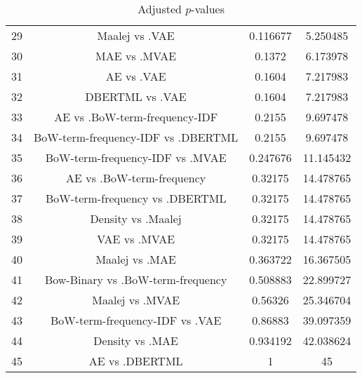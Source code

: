 \documentclass[a4paper,10pt]{article}
\begin{document}
\begin{landscape}
\begin{table}[!htp]
\begin{tabular}{cccc}
29&Maalej vs .VAE&0.116677&5.250485\\
30&MAE vs .MVAE&0.1372&6.173978\\
31&AE vs .VAE&0.1604&7.217983\\
32&DBERTML vs .VAE&0.1604&7.217983\\
33&AE vs .BoW-term-frequency-IDF&0.2155&9.697478\\
34&BoW-term-frequency-IDF vs .DBERTML&0.2155&9.697478\\
35&BoW-term-frequency-IDF vs .MVAE&0.247676&11.145432\\
36&AE vs .BoW-term-frequency&0.32175&14.478765\\
37&BoW-term-frequency vs .DBERTML&0.32175&14.478765\\
38&Density vs .Maalej&0.32175&14.478765\\
39&VAE vs .MVAE&0.32175&14.478765\\
40&Maalej vs .MAE&0.363722&16.367505\\
41&Bow-Binary vs .BoW-term-frequency&0.508883&22.899727\\
42&Maalej vs .MVAE&0.56326&25.346704\\
43&BoW-term-frequency-IDF vs .VAE&0.86883&39.097359\\
44&Density vs .MAE&0.934192&42.038624\\
45&AE vs .DBERTML&1&45\\
\hline
\end{tabular}
\caption{Adjusted $p$-values}
\end{table}

\end{landscape}
\end{document}
